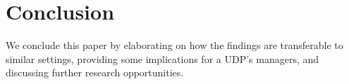 \section{Conclusion}
\label{con}

We conclude this paper by elaborating on how the findings are transferable
    to similar settings, providing some implications for a UDP's
    managers, and discussing further research opportunities.

